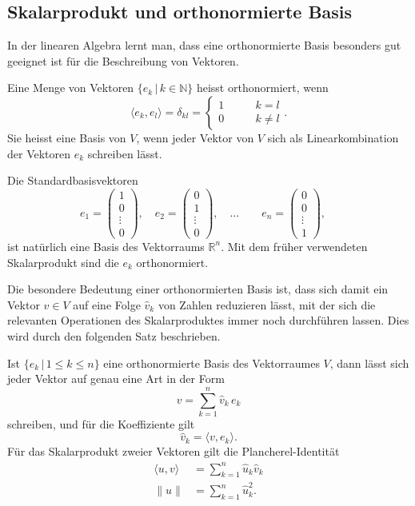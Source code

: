\subsection{Skalarprodukt und orthonormierte Basis}
In der linearen Algebra lernt man, dass eine orthonormierte Basis besonders
gut geeignet ist für die Beschreibung von Vektoren.

\begin{definition}
Eine Menge von Vektoren $\{e_k\,|\, k\in\mathbb N\}$ heisst orthonormiert,
wenn
\[
\langle e_k,e_l\rangle
=
\delta_{kl}
=
\begin{cases}
1 &\qquad k=l\\
0 &\qquad k\ne l
\end{cases}.
\]
Sie heisst eine Basis von $V$, wenn jeder Vektor von $V$ sich als
Linearkombination der Vektoren $e_k$ schreiben lässt.
\end{definition}

Die Standardbasisvektoren
\[
e_1 = \begin{pmatrix}1\\0\\\vdots\\0\end{pmatrix},\quad
e_2 = \begin{pmatrix}0\\1\\\vdots\\0\end{pmatrix},\quad
\dots
\qquad
e_n = \begin{pmatrix}0\\0\\\vdots\\1\end{pmatrix},\quad
\]
ist natürlich eine Basis des Vektorraums $\mathbb R^n$.
Mit dem früher verwendeten Skalarprodukt sind die $e_k$ orthonormiert.

Die besondere Bedeutung einer orthonormierten Basis ist, dass sich damit
ein Vektor $v\in V$ auf eine Folge $\hat{v}_k$ von Zahlen reduzieren 
lässt, mit der sich die relevanten Operationen des Skalarproduktes
immer noch durchführen lassen.
Dies wird durch den folgenden Satz beschrieben.

\begin{satz}
\label{satz:parseval}
Ist $\{e_k\,|\, 1\le k\le n\}$ eine orthonormierte Basis des Vektorraumes
$V$, dann lässt sich jeder Vektor auf genau eine Art in der Form 
\begin{equation}
v = \sum_{k=1}^n \hat v_k\, e_k
\label{gemoetrie:zerlegung}
\end{equation}
schreiben, und für die Koeffiziente gilt
\begin{equation}
\hat{v}_k = \langle v,e_k\rangle.
\label{geometrie:synthese}
\end{equation}
Für das Skalarprodukt zweier Vektoren gilt die Plancherel-Identität
\begin{align}
\langle u,v\rangle
&=
\sum_{k=1}^n \hat{u}_k\hat{v}_k
\label{geometrie:parseval-prod}
\\
\|u\|
&=
\sum_{k=1}^n \hat{u}_k^2.
\label{geometrie:parseval-norm}
\end{align}
\end{satz}


